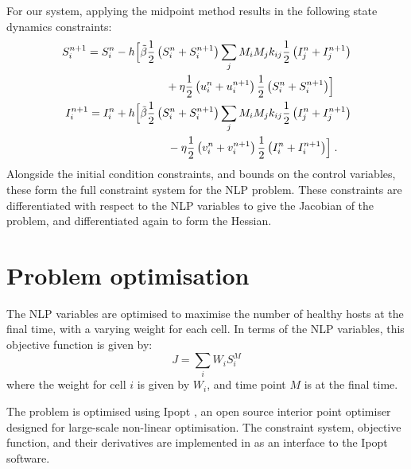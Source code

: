 For our system, applying the midpoint method results in the following state dynamics constraints:
\begin{subequations}
    \label{eqn:appB:dyn_constraints}
    \begin{align}
        \begin{split}
        S_i^{n+1} &= S_i^n - h\Bigl[\tilde{\beta}\frac{1}{2}\left(S_i^n + S_i^{n+1}\right)\sum_jM_iM_jk_{ij}\frac{1}{2}\left(I_j^n + I_j^{n+1}\right)\\
        &\hspace{2.5cm} + \eta{}\frac{1}{2}\left(u_i^n + u_i^{n+1}\right)\frac{1}{2}\left(S_i^n + S_i^{n+1}\right)\Bigr]
        \end{split}\\
        \begin{split}
            I_i^{n+1} &= I_i^n + h\Bigl[\tilde{\beta}\frac{1}{2}\left(S_i^n + S_i^{n+1}\right)\sum_jM_iM_jk_{ij}\frac{1}{2}\left(I_j^n + I_j^{n+1}\right)\\
            &\hspace{2.5cm} - \eta{}\frac{1}{2}\left(v_i^n + v_i^{n+1}\right)\frac{1}{2}\left(I_i^n + I_i^{n+1}\right)\Bigr]\;.
            \end{split}
    \end{align}
\end{subequations}
Alongside the initial condition constraints, and bounds on the control variables, these form the full constraint system for the NLP problem. These constraints are differentiated with respect to the NLP variables to give the Jacobian of the problem, and differentiated again to form the Hessian.

\section{Problem optimisation\label{app:redwood_opt}}

The NLP variables are optimised to maximise the number of healthy hosts at the final time, with a varying weight for each cell. In terms of the NLP variables, this objective function is given by:
\begin{equation}
    J = \sum_iW_iS_i^M
\end{equation}
where the weight for cell $i$ is given by $W_i$, and time point $M$ is at the final time.

The problem is optimised using Ipopt \citep{wachter_implementation_2006}, an open source interior point optimiser designed for large-scale non-linear optimisation. The constraint system, objective function, and their derivatives are implemented in \CC{} as an interface to the Ipopt software.
